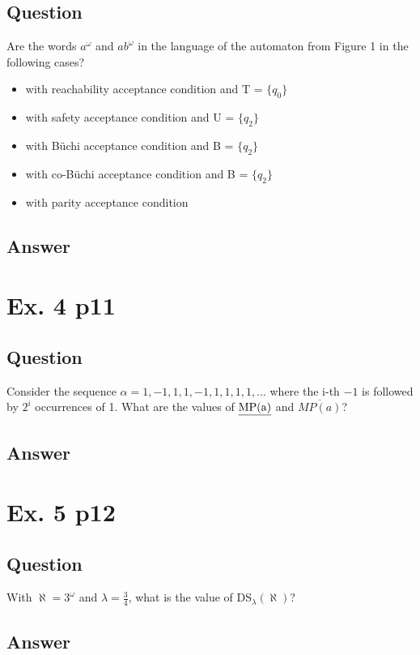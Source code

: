 \documentclass[12pt]{article}
\begin{document}
\subsection{Question}
Are the words $a^\omega$ and $ab^\omega$ in the language of the automaton from Figure 1 in the following cases?
\begin{itemize}
	\item with reachability acceptance condition and T = $\{q_0\}$
	\item with safety acceptance condition and U = $\{q_2\}$
	\item with Büchi acceptance condition and B = $\{q_2\}$
	\item with co-Büchi acceptance condition and B = $\{q_2\}$
	\item with parity acceptance condition
\end{itemize}

\subsection{Answer}


\section{Ex. 4 p11}
\subsection{Question}
Consider the sequence $\alpha = 1,-1, 1, 1,-1, 1, 1, 1, 1, . . .$ where the i-th $-1$ is followed by $2^i$ occurrences of 1. What are the values of $\textrm{\underline{MP(a)}}$ and $\overline{MP(a)}$?

\subsection{Answer}


\section{Ex. 5 p12}
\subsection{Question}
With $\aleph = 3^\omega$ and $\lambda = \frac{3}{4}$, what is the value of DS$_\lambda(\aleph)$?

\subsection{Answer}
\end{document}
